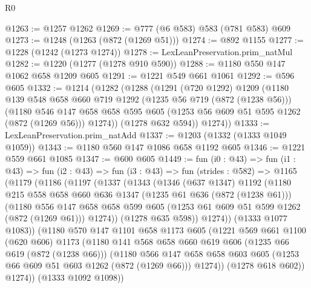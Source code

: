 \begin{lexlean}{R0}
\begin{coremodule}
@1263 := @1257 @1262
@1269 := @777 (@6 @583) @583 (@781 @583) @609
@1273 := @1248 (@1263 (@872 (@1269 @51)))
@1274 := @892 @1155
@1277 := @1228 (@1242 (@1273 @1274))
@1278 := LexLeanPreservation.prim_natMul
@1282 := @1220 (@1277 (@1278 @910 @590))
@1288 := @1180 @550 @147 @1062 @658 @1209 @605
@1291 := @1221 @549 @661 @1061
@1292 := @596 @605
@1332 := @1214
    (@1282
      (@1288
        (@1291
          (@720 @1292)
          @1209
          (@1180
            @139
            @548
            @658
            @660
            @719
            @1292
            (@1235 @56 @719 (@872 (@1238 @56)))
            (@1180
              @546
              @147
              @658
              @658
              @595
              @605
              (@1253 @56 @609 @51 @595 @1262 (@872 (@1269 @56)))
              @1274))
          (@1278 @632 @594))
        @1274))
@1333 := LexLeanPreservation.prim_natAdd
@1337 := @1203 (@1332 (@1333 @1049 @1059))
@1343 := @1180 @560 @147 @1086 @658 @1192 @605
@1346 := @1221 @559 @661 @1085
@1347 := @600 @605
@1449 := fun (i0 : @43) =>
  fun (i1 : @43) =>
  fun (i2 : @43) =>
  fun (i3 : @43) =>
  fun (strides : @582) =>
  @1165
    (@1179
      (@1186
        (@1197
          (@1337
            (@1343
              (@1346
                (@637 @1347)
                @1192
                (@1180
                  @215
                  @558
                  @658
                  @660
                  @636
                  @1347
                  (@1235 @61 @636 (@872 (@1238 @61)))
                  (@1180
                    @556
                    @147
                    @658
                    @658
                    @599
                    @605
                    (@1253 @61 @609 @51 @599 @1262 (@872 (@1269 @61)))
                    @1274))
                (@1278 @635 @598))
              @1274))
          (@1333 @1077 @1083))
        (@1180
          @570
          @147
          @1101
          @658
          @1173
          @605
          (@1221
            @569
            @661
            @1100
            (@620 @606)
            @1173
            (@1180
              @141
              @568
              @658
              @660
              @619
              @606
              (@1235 @66 @619 (@872 (@1238 @66)))
              (@1180
                @566
                @147
                @658
                @658
                @603
                @605
                (@1253 @66 @609 @51 @603 @1262 (@872 (@1269 @66)))
                @1274))
            (@1278 @618 @602))
          @1274))
      (@1333 @1092 @1098))

\end{coremodule}
\end{lexlean}
